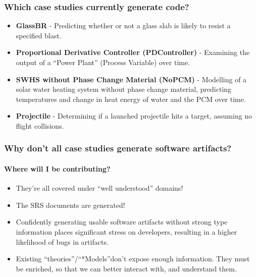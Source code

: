 \documentclass{beamer}
\begin{document}
\begin{frame}
    \frametitle{Which case studies currently generate code?}

    \begin{itemize}
        \item<1-> \textbf{GlassBR} - Predicting whether or not a glass slab is likely to resist a specified blast.
        \item<2-> \textbf{Proportional Derivative Controller (PDController)} - Examining the output of a ``Power Plant'' (Process Variable) over time.
        \item<3-> \textbf{SWHS without Phase Change Material (NoPCM)} - Modelling of a solar water heating system without phase change material, predicting temperatures and change in heat energy of water and the PCM over time.
        \item<4-> \textbf{Projectile} - Determining if a launched projectile hits a target, assuming no flight collisions.
    \end{itemize}
\end{frame}

\begin{frame}
    \frametitle{Why don't all case studies generate software artifacts?}
    \framesubtitle{Where will I be contributing?}

    \begin{itemize}
        \item<3-> They're all covered under ``well understood'' domains!
        \item<4-> The SRS documents are generated!\\
    \end{itemize}


    \begin{itemize}
        \item<7-> Confidently generating usable software artifacts without strong type information places significant stress on developers, resulting in a higher likelihood of bugs in artifacts.
        \item<8-> Existing ``theories''/``*Models''\footnotemark[1] don't expose enough information. They must be enriched, so that we can better interact with, and understand them.
    \end{itemize}

\end{frame}
\end{document}
